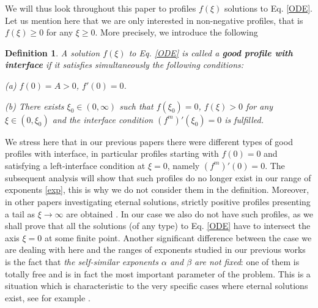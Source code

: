 \documentclass[a4paper,11pt]{article}
\newtheorem{definition}[theorem]{Definition}
\numberwithin{equation}{section}
\begin{document}
We will thus look throughout this paper to profiles $f(\xi)$ solutions to Eq. \eqref{ODE}. Let us mention here that we are only interested in non-negative profiles, that is $f(\xi)\geq0$ for any $\xi\geq0$. More precisely, we introduce the following
\begin{definition}
A solution $f(\xi)$ to Eq. \eqref{ODE} is called a \textbf{good profile with interface} if it satisfies simultaneously the following conditions:

(a) $f(0)=A>0$, $f'(0)=0$.

(b) There exists $\xi_0\in(0,\infty)$ such that $f(\xi_0)=0$, $f(\xi)>0$ for any $\xi\in(0,\xi_0)$ and the interface condition $(f^m)'(\xi_0)=0$ is fulfilled.
\end{definition}
We stress here that in our previous papers \cite{IS20b, IS21b} there were different types of good profiles with interface, in particular profiles starting with $f(0)=0$ and satisfying a left-interface condition at $\xi=0$, namely $(f^m)'(0)=0$. The subsequent analysis will show that such profiles do no longer exist in our range of exponents \eqref{exp}, this is why we do not consider them in the definition. Moreover, in other papers investigating eternal solutions, strictly positive profiles presenting a tail as $\xi\to\infty$ are obtained \cite{GPV00, IL13}. In our case we also do not have such profiles, as we shall prove that all the solutions (of any type) to Eq. \eqref{ODE} have to intersect the axis $\xi=0$ at some finite point. Another significant difference between the case we are dealing with here and the ranges of exponents studied in our previous works \cite{IS20b, IS21b} is the fact that \emph{the self-similar exponents $\alpha$ and $\beta$ are not fixed}: one of them is totally free and is in fact the most important parameter of the problem. This is a situation which is characteristic to the very specific cases where eternal solutions exist, see for example \cite{IL13}.
\end{document}
